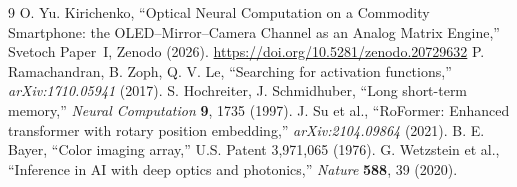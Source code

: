 \documentclass[11pt]{article}
\begin{document}
\begin{thebibliography}{9}\small
{} O. Yu. Kirichenko, ``Optical Neural Computation on a Commodity Smartphone: the OLED--Mirror--Camera Channel as an Analog Matrix Engine,'' Svetoch Paper~I, Zenodo (2026). \url{https://doi.org/10.5281/zenodo.20729632}
 P. Ramachandran, B. Zoph, Q. V. Le, ``Searching for activation functions,'' \emph{arXiv:1710.05941} (2017).
 S. Hochreiter, J. Schmidhuber, ``Long short-term memory,'' \emph{Neural Computation} \textbf{9}, 1735 (1997).
 J. Su et al., ``RoFormer: Enhanced transformer with rotary position embedding,'' \emph{arXiv:2104.09864} (2021).
 B. E. Bayer, ``Color imaging array,'' U.S. Patent 3,971,065 (1976).
 G. Wetzstein et al., ``Inference in AI with deep optics and photonics,'' \emph{Nature} \textbf{588}, 39 (2020).
\end{thebibliography}

\svetochfooter
\end{document}
